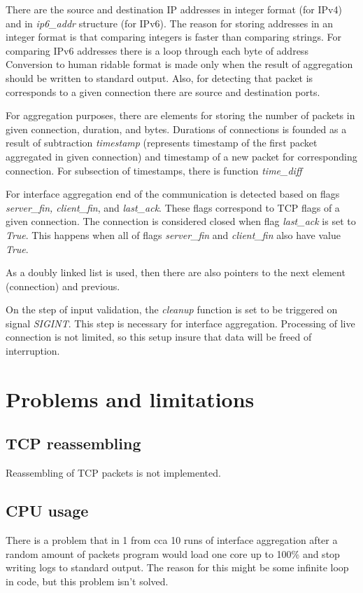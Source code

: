 \documentclass[12pt,a4paper]{article}
\begin{document}
    There are the source and destination IP addresses in integer format (for IPv4) 
    and in \textit{ip6\_addr} structure (for IPv6). The 
    reason for storing addresses in an integer format is that comparing integers
    is faster than comparing strings. For comparing IPv6 addresses there is a loop 
    through each byte of address Conversion to human ridable format is 
    made only when the result of aggregation should be written to standard output. 
    Also, for detecting that packet is corresponds to a given connection there 
    are source and destination ports. 

    For aggregation purposes, there are elements for storing the number of packets
    in given connection, duration, and bytes. Durations of connections is founded 
    as a result of subtraction \textit{timestamp} (represents timestamp of the first 
    packet aggregated in given connection) and timestamp of a new packet for 
    corresponding connection. For subsection of timestamps, there is function 
    \textit{time\_diff} 

    For interface aggregation end of the communication is detected based on flags 
    \textit{server\_fin, client\_fin}, and \textit{last\_ack}. These flags correspond 
    to TCP flags of a given connection. The connection is considered closed when 
    flag \textit{last\_ack} is set to \textit{True}. This happens when all of 
    flags \textit{server\_fin} and \textit{client\_fin} also have value \textit{True}. 

    As a doubly linked list is used, then there are also pointers to the next 
    element (connection) and previous. 

    On the step of input validation, the \textit{cleanup} function is set to be 
    triggered on signal \textit{SIGINT}. This step is necessary for interface 
    aggregation. Processing of live connection is not limited, so this setup 
    insure that data will be freed of interruption.

    \section{Problems and limitations}
    \subsection{TCP reassembling}
    Reassembling of TCP packets is not implemented.
    
    \subsection{CPU usage}
    There is a problem that in 1 from cca 10 runs of interface aggregation after a 
    random amount of packets program would load one core up to 100\% and stop 
    writing logs to standard output. The reason for this might be some infinite 
    loop in code, but this problem isn't solved.  
\end{document}

